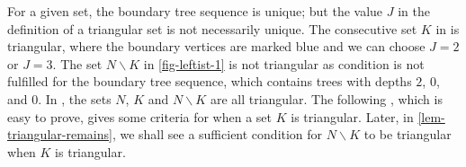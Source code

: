 For a given set, the boundary tree sequence is unique;
but the value $J$ in the definition of a triangular set is not necessarily unique.
The consecutive set $K$ in  is triangular,
where the boundary vertices are marked blue
and we can choose $J = 2$ or $J = 3$.
The set $N \backslash K$ in \cref{fig-leftist-1} is not triangular
as condition  is not fulfilled for the boundary tree sequence,
which contains trees with depths $2$, $0$, and $0$.
In , the sets $N$, $K$ and $N \backslash K$
are all triangular.
The following , which is easy to prove,
gives some criteria for when a set $K$ is triangular.
Later, in \cref{lem-triangular-remains},
we shall see a sufficient condition for $N \backslash K$ to be triangular
when $K$ is triangular.

